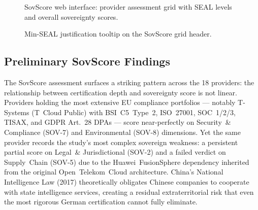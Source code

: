 \begin{figure}[htbp]
  \centering
  \caption{SovScore web interface: provider assessment grid with SEAL levels and overall sovereignty scores.}
  \label{fig:sovscore_ui}
\end{figure}

\begin{figure}[htbp]
  \centering
  \caption{Min-SEAL justification tooltip on the SovScore grid header.}
  \label{fig:sovscore_tooltip}
\end{figure}


\subsection{Preliminary SovScore Findings}
\label{subsec:sovscore_preliminary}

The SovScore assessment surfaces a striking pattern across the 18 providers: the relationship between certification depth and sovereignty score is not linear. Providers holding the most extensive EU compliance portfolios — notably T-Systems (T~Cloud Public) with BSI~C5~Type~2, ISO~27001, SOC~1/2/3, TISAX, and GDPR Art.~28 DPAs — score near-perfectly on Security~\& Compliance (SOV-7) and Environmental (SOV-8) dimensions. Yet the same provider records the study's most complex sovereign weakness: a persistent partial score on Legal~\& Jurisdictional (SOV-2) and a failed verdict on Supply~Chain (SOV-5) due to the Huawei~FusionSphere dependency inherited from the original Open~Telekom~Cloud architecture. China's National Intelligence Law (2017) theoretically obligates Chinese companies to cooperate with state intelligence services, creating a residual extraterritorial risk that even the most rigorous German certification cannot fully eliminate.

